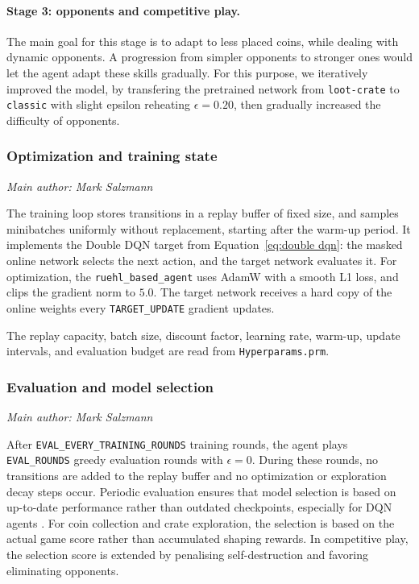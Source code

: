 \documentclass[11pt,a4paper]{article}
\newcommand{\contributionauthor}[1]{{\small\textit{Main author: #1}\par}}
\begin{document}
\paragraph{Stage 3: opponents and competitive play.}
The main goal for this stage is to adapt to less placed coins, while dealing with dynamic opponents.
A progression from simpler opponents to stronger ones would let the agent adapt these skills gradually. 
For this purpose, we iteratively improved the model, by transfering the pretrained network from \texttt{loot-crate} to \texttt{classic} with slight epsilon reheating $\epsilon = 0.20$, then gradually increased the difficulty of opponents.

\subsubsection{Optimization and training state}
\contributionauthor{Mark Salzmann}
The training loop stores transitions in a replay buffer of fixed size, and samples
minibatches uniformly without replacement, starting after the warm-up period.
It implements the Double DQN target from Equation~\eqref{eq:double dqn}:
the masked online network selects the next action, and the target network
evaluates it. 
For optimization, the \texttt{ruehl\_based\_agent} uses AdamW with a smooth L1 loss, and clips the gradient norm
to $5.0$. 
The target network receives a hard copy of the online weights every \texttt{TARGET\_UPDATE} gradient updates.

The replay capacity, batch size, discount factor, learning rate, warm-up,
update intervals, and evaluation budget are read from \texttt{Hyperparams.prm}.

\subsubsection{Evaluation and model selection}
\contributionauthor{Mark Salzmann}
After \texttt{EVAL\_EVERY\_TRAINING\_ROUNDS} training rounds, the agent plays
\texttt{EVAL\_ROUNDS} greedy evaluation rounds with $\epsilon=0$. During
these rounds, no transitions are added to the replay buffer and no optimization or
exploration decay steps occur. 
Periodic evaluation ensures that model selection is based on up-to-date performance rather than outdated checkpoints, especially for DQN agents \citep{roderick2017implementing}.
For coin collection and crate exploration, the selection is based on the actual game score rather than accumulated shaping rewards. 
In competitive play, the selection score is extended by penalising self-destruction and favoring eliminating opponents.
\end{document}

